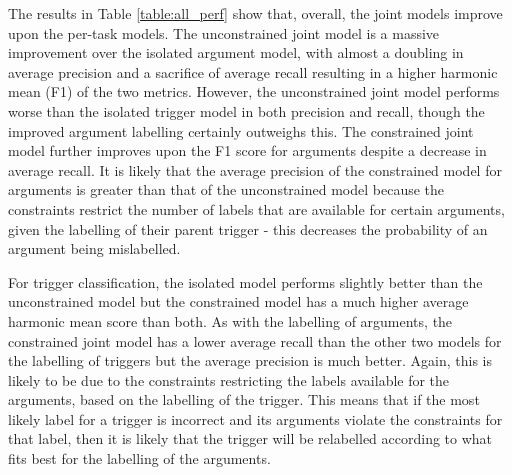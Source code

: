\documentclass{article} %
\begin{document}
\begin{table}[htb]
\centering
\caption{Performance of models}
\label{table:all_perf}
\end{table}
The results in Table \ref{table:all_perf} show that, overall, the joint models improve upon the per-task models. The unconstrained joint model is a massive improvement over the isolated argument model, with almost a doubling in average precision and a sacrifice of average recall resulting in a higher harmonic mean (F1) of the two metrics. However, the unconstrained joint model performs worse than the isolated trigger model in both precision and recall, though the improved argument labelling certainly outweighs this. The constrained joint model further improves upon the F1 score for arguments despite a decrease in average recall. It is likely that the average precision of the constrained model for arguments is greater than that of the unconstrained model because the constraints restrict the number of labels that are available for certain arguments, given the labelling of their parent trigger - this decreases the probability of an argument being mislabelled.

For trigger classification, the isolated model performs slightly better than the unconstrained model but the constrained model has a much higher average harmonic mean score than both. As with the labelling of arguments, the constrained joint model has a lower average recall than the other two models for the labelling of triggers but the average precision is much better. Again, this is likely to be due to the constraints restricting the labels available for the arguments, based on the labelling of the trigger. This means that if the most likely label for a trigger is incorrect and its arguments violate the constraints for that label, then it is likely that the trigger will be relabelled according to what fits best for the labelling of the arguments.
\end{document}
